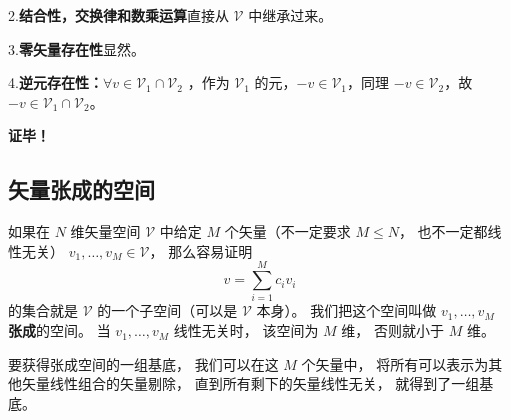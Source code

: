 2.\textbf{结合性，交换律和数乘运算}直接从 $\mathcal V$ 中继承过来。

3.\textbf{零矢量存在性}显然。

4.\textbf{逆元存在性：}$\forall v\in\mathcal V_1\cap\mathcal V_2$ ，作为 $\mathcal V_1$ 的元，$-v\in \mathcal V_1$，同理 $-v\in\mathcal V_2$，故 $-v\in\mathcal V_1\cap\mathcal V_2$。

\textbf{证毕！}


\subsection{矢量张成的空间}
如果在 $N$ 维矢量空间 $\mathcal V$ 中给定 $M$ 个矢量（不一定要求 $M \leqslant N$， 也不一定都线性无关） ${v_1}, \dots, {v_M} \in \mathcal V$， 那么容易证明
\begin{equation}
{v} = \sum_{i=1}^M c_i {v_i}
\end{equation}
的集合就是 $\mathcal V$ 的一个子空间（可以是 $\mathcal V$ 本身）。 我们把这个空间叫做 ${v_1}, \dots, {v_M}$ \textbf{张成}的空间。 当 ${v_1}, \dots, {v_M}$ 线性无关时， 该空间为 $M$ 维， 否则就小于 $M$ 维。

要获得张成空间的一组基底， 我们可以在这 $M$ 个矢量中， 将所有可以表示为其他矢量线性组合的矢量剔除， 直到所有剩下的矢量线性无关， 就得到了一组基底。
